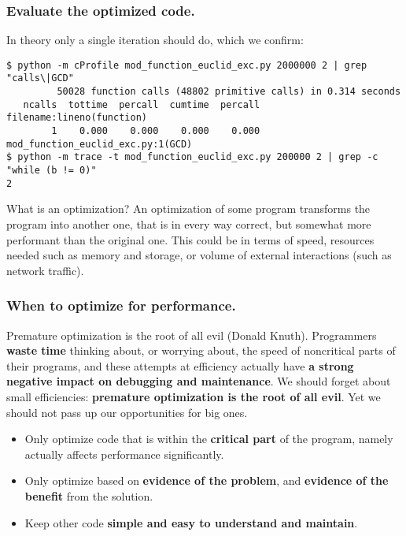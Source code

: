 \documentclass{beamer} %
\newcommand\emc[1]{\textcolor{brightblue}{\textbf{#1}}}
\begin{document}

\begin{frame}[fragile]
\frametitle{Evaluate the optimized code.}

In theory only a single iteration should do, which we confirm:
\begin{Verbatim}[fontsize=\scriptsize]
$ python -m cProfile mod_function_euclid_exc.py 2000000 2 | grep "calls\|GCD"
         50028 function calls (48802 primitive calls) in 0.314 seconds
   ncalls  tottime  percall  cumtime  percall filename:lineno(function)
        1    0.000    0.000    0.000    0.000 mod_function_euclid_exc.py:1(GCD)
$ python -m trace -t mod_function_euclid_exc.py 200000 2 | grep -c "while (b != 0)"
2
\end{Verbatim}

\begin{block}{What is an optimization?}
An optimization of some program transforms the program into another one, that is in every way correct, but somewhat more performant than the original one. This could be in terms of speed, resources needed such as memory and storage, or volume of external interactions (such as network traffic).
\end{block}

\end{frame}


\begin{frame}
\frametitle{When to optimize for performance.}

\begin{block}{Premature optimization is the root of all evil (Donald Knuth).}
\footnotesize
Programmers \emc{waste time} thinking about, or worrying about, the speed of noncritical parts of their programs, and these attempts at efficiency actually have \emc{a strong negative impact on debugging and maintenance}. We should forget about small efficiencies: \emc{premature optimization is the root of all evil}. Yet we should not pass up our opportunities for big ones.
\end{block}

\begin{itemize}
\item Only optimize code that is within the \emc{critical part} of the program, namely actually affects performance significantly.
\item Only optimize based on \emc{evidence of the problem}, and \emc{evidence of the benefit} from the solution.
\item Keep other code \emc{simple and easy to understand and maintain}.
\end{itemize}

\end{frame}
\end{document}
